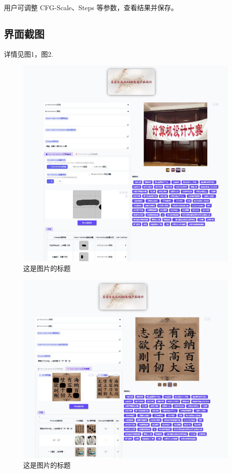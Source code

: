 \documentclass[a4paper,12pt]{article}
\begin{document}
用户可调整 CFG-Scale、Steps 等参数，查看结果并保存。
\subsection{界面截图}
详情见图1，图2.
\begin{figure}[htbp] %
    \centering %
    \includegraphics[width=1\textwidth]{Image/UI_1.png} %
    \caption{这是图片的标题} %
    \label{fig:logo} %
\end{figure}
\begin{figure}[htbp] %
    \centering %
    \includegraphics[width=1\textwidth]{Image/UI_2.png} %
    \caption{这是图片的标题} %
    \label{fig:logo} %
\end{figure}
\end{document}
